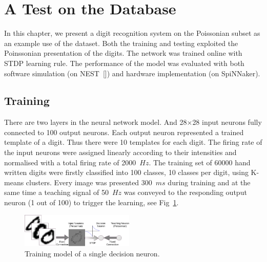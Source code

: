 \section{A Test on the Database}
\label{sec:test}
In this chapter, we present a digit recognition system on the Poissonian subset as an example use of the dataset.
Both the training and testing exploited the Poinssonian presentation of the digits.
The network was trained online with STDP learning rule.
The performance of the model was evaluated with both software simulation (on NEST~[\cite{gewaltig2007nest}]) and hardware implementation (on SpiNNaker). 
\subsection{Training}
There are two layers in the neural network model.
And 28$\times$28 input neurons fully connected to 100 output neurons.
Each output neuron represented a trained template of a digit.
Thus there were 10 templates for each digit.
The firing rate of the input neurons were assigned linearly according to their intensities and normalised with a total firing rate of 2000~$Hz$.
The training set of 60000 hand written digits were firstly classified into 100 classes, 10 classes per digit, using K-means clusters.
Every image was presented 300~$ms$ during training and at the same time a teaching signal of 50~$Hz$ was conveyed to the responding output neuron (1 out of 100) to trigger the learning, see Fig~\ref{Fig:train}.
\begin{figure}[hbt!]
	\centering
	\includegraphics[width=0.48\textwidth]{images/training.pdf}
	\caption{Training model of a single decision neuron.}
	\label{Fig:train}
\end{figure} 

